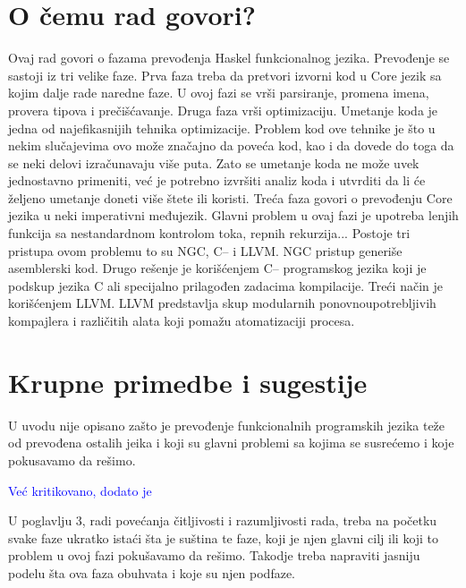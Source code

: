 \documentclass[a4paper]{report}
\newcommand{\odgovor}[1]{\textcolor{blue}{#1}}
\begin{document}
	\section{O čemu rad govori?}
	Ovaj rad govori o fazama prevođenja Haskel funkcionalnog jezika. Prevođenje se sastoji iz tri velike faze.
	Prva faza treba da pretvori izvorni kod u Core jezik sa kojim dalje rade naredne faze. U ovoj fazi se vrši parsiranje, promena imena, provera tipova i prečišćavanje.
	Druga faza vrši optimizaciju. Umetanje koda je jedna od najefikasnijih tehnika optimizacije. Problem kod ove tehnike je što u nekim slučajevima ovo može značajno da poveća kod, kao i da dovede do toga da se neki delovi izračunavaju više puta. Zato se umetanje koda ne može uvek jednostavno primeniti, već je potrebno izvršiti analiz koda i utvrditi da li će željeno umetanje doneti više štete ili koristi.
	Treća faza govori o prevođenju Core jezika u neki imperativni međujezik. Glavni problem u ovaj fazi je upotreba lenjih funkcija sa nestandardnom kontrolom toka, repnih rekurzija... Postoje tri pristupa ovom problemu to su NGC, C-- i LLVM. NGC pristup generiše asemblerski kod. Drugo rešenje je korišćenjem C-- programskog jezika koji je podskup jezika C ali specijalno prilagođen zadacima kompilacije. Treći način je korišćenjem LLVM. LLVM predstavlja skup modularnih ponovnoupotrebljivih kompajlera i različitih alata koji pomažu atomatizaciji procesa.
	
	\section{Krupne primedbe i sugestije}
	
	U uvodu nije opisano zašto je prevođenje funkcionalnih programskih jezika teže od prevođena ostalih jeika i koji su glavni problemi sa kojima se susrećemo i koje pokusavamo da rešimo.
	
	\odgovor{Već kritikovano, dodato je}
	
	U poglavlju 3, radi povećanja čitljivosti i razumljivosti rada, treba na početku svake faze ukratko istaći šta je suština te faze, koji je njen glavni cilj ili koji to problem u ovoj fazi pokušavamo da rešimo. Takodje treba napraviti jasniju podelu šta ova faza obuhvata i koje su njen podfaze.
	
\end{document}
